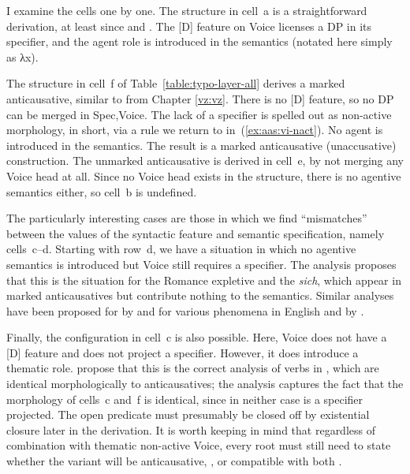 \begin{exe}
\begin{xlist}
\begin{exe}
\begin{exe}
\begin{xlist}
\begin{exe}
I examine the cells one by one. The structure in cell~a is a straightforward  derivation, at least since \cite{kratzer96} and \citep{pylkkanen08}. The [D] feature on Voice licenses a DP in its specifier, and the agent role is introduced in the semantics (notated here simply as λx).

The structure in cell~f of Table~\ref{table:typo-layer-all} derives a marked anticausative, similar to {\tnif} from Chapter \ref{vz:vz}. There is no [D] feature, so no DP can be merged in Spec,Voice. The lack of a specifier is spelled out as non-active morphology,  in short, via a rule we return to in~(\ref{ex:aas:vi-nact}). No agent is introduced in the semantics. The result is a marked anticausative (unaccusative) construction. The unmarked anticausative is derived in cell~e, by not merging any Voice head at all. Since no Voice head exists in the structure, there is no agentive semantics either, so cell~b is undefined.

The particularly interesting cases are those in which we find ``mismatches'' between the values of the syntactic feature and semantic specification, namely cells~c--d. Starting with row~d, we have a situation in which no agentive semantics is introduced but Voice still requires a specifier. The  analysis proposes that this is the situation for the Romance expletive  and the  \emph{sich}, which appear in marked anticausatives but contribute nothing to the semantics. Similar analyses have been proposed for  by \cite{wood14nllt,wood15springer} and for various phenomena in English and  by \cite{myler16mit}.

Finally, the configuration in cell~c is also possible. Here, Voice does not have a [D] feature and does not project a specifier. However, it does introduce a thematic role. \cite{layering15} propose that this is the correct analysis of  verbs in , which are identical morphologically to anticausatives; the analysis captures the fact that the morphology of cells~c and~f is identical, since in neither case is a specifier projected. The open predicate must presumably be closed off by existential closure later in the derivation. It is worth keeping in mind that regardless of combination with thematic non-active Voice, every root must still need to state whether the  variant will be anticausative, , or compatible with both \citep[88]{alexiadouanagnostopoulou04,layering15}.



\end{exe}
\end{xlist}
\end{exe}
\end{exe}
\end{xlist}
\end{exe}
